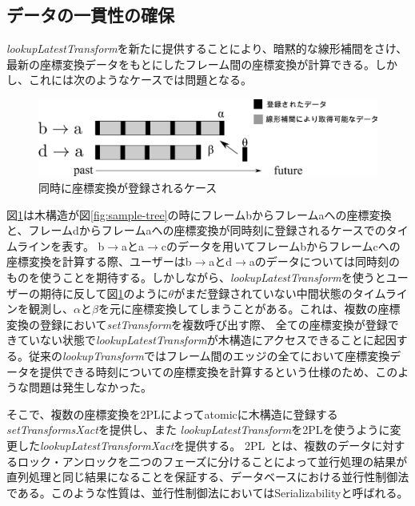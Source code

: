 \documentclass[a4paper]{jreport}	%
\begin{document}
\subsection{データの一貫性の確保}
\textit{lookupLatestTransform}を新たに提供することにより、暗黙的な線形補間をさけ、最新の座標変換データをもとにしたフレーム間の座標変換が計算できる。しかし、これには次のようなケースでは問題となる。

\begin{figure}[h] 
\centering
\includegraphics[width=12cm]{coming-same-time}
\caption{同時に座標変換が登録されるケース}
\label{fig:coming-same-time}
\end{figure}


図\ref{fig:coming-same-time}は木構造が図\ref{fig:sample-tree}の時にフレームbからフレームaへの座標変換と、フレームdからフレームaへの座標変換が同時刻に登録されるケースでのタイムラインを表す。
b$\rightarrow$aとa$\rightarrow$cのデータを用いてフレームbからフレームcへの座標変換を計算する際、ユーザーはb$\rightarrow$aとd$\rightarrow$aのデータについては同時刻のものを使うことを期待する。しかしながら、\textit{lookupLatestTransform}を使うとユーザーの期待に反して図\ref{fig:coming-same-time}のように$\theta$がまだ登録されていない中間状態のタイムラインを観測し、$\alpha$と$\beta$を元に座標変換してしまうことがある。これは、複数の座標変換の登録において\textit{setTransform}を複数呼び出す際、 全ての座標変換が登録できていない状態で\textit{lookupLatestTransform}が木構造にアクセスできることに起因する。従来の\textit{lookupTransform}ではフレーム間のエッジの全てにおいて座標変換データを提供できる時刻についての座標変換を計算するという仕様のため、このような問題は発生しなかった。


そこで、複数の座標変換を2PLによってatomicに木構造に登録する\textit{setTransformsXact}を提供し、また
\textit{lookupLatestTransform}を2PLを使うように変更した\textit{lookupLatestTransformXact}を提供する。
2PL~\cite{2PL}とは、複数のデータに対するロック・アンロックを二つのフェーズに分けることによって並行処理の結果が直列処理と同じ結果になることを保証する、データベースにおける並行性制御法である。このような性質は、並行性制御法においてはSerializabilityと呼ばれる。
\end{document}
